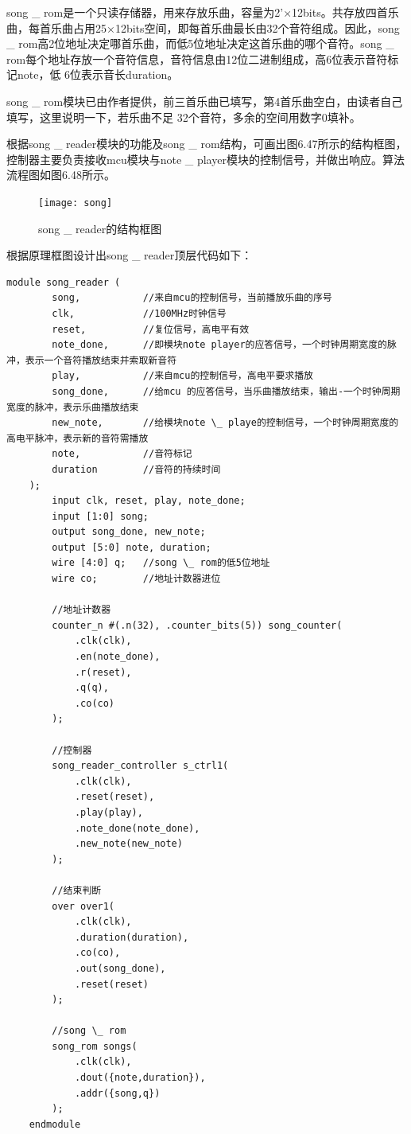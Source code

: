 \documentclass{../source/Experiment}
\begin{document}
                song \_ rom是一个只读存储器，用来存放乐曲，容量为2'×12bits。共存放四首乐曲，每首乐曲占用25×12bits空间，即每首乐曲最长由32个音符组成。因此，song \_ rom高2位地址决定哪首乐曲，而低5位地址决定这首乐曲的哪个音符。song \_ rom每个地址存放一个音符信息，音符信息由12位二进制组成，高6位表示音符标记note，低 6位表示音长duration。 
                
                song \_ rom模块已由作者提供，前三首乐曲已填写，第4首乐曲空白，由读者自己填写，这里说明一下，若乐曲不足 32个音符，多余的空间用数字0填补。
                
                根据song \_ reader模块的功能及song  \_ rom结构，可画出图6.47所示的结构框图，控制器主要负责接收mcu模块与note \_ player模块的控制信号，并做出响应。算法流程图如图6.48所示。

                \begin{figure}[H]
                    \centering
                    \texttt{[image: song]}
                    \caption{song \_ reader的结构框图}
                \end{figure}

                根据原理框图设计出song \_ reader顶层代码如下：
                \begin{lstlisting}[name = song _ reader顶层代码]
    module song_reader (
        song,           //来自mcu的控制信号，当前播放乐曲的序号
        clk,            //100MHz时钟信号
        reset,          //复位信号，高电平有效
        note_done,      //即模块note player的应答信号，一个时钟周期宽度的脉冲，表示一个音符播放结束并索取新音符
        play,           //来自mcu的控制信号，高电平要求播放
        song_done,      //给mcu 的应答信号，当乐曲播放结束，输出-一个时钟周期宽度的脉冲，表示乐曲播放结束
        new_note,       //给模块note \_ playe的控制信号，一个时钟周期宽度的高电平脉冲，表示新的音符需播放
        note,           //音符标记
        duration        //音符的持续时间
    );
        input clk, reset, play, note_done;
        input [1:0] song;
        output song_done, new_note;
        output [5:0] note, duration;
        wire [4:0] q;   //song \_ rom的低5位地址
        wire co;        //地址计数器进位

        //地址计数器
        counter_n #(.n(32), .counter_bits(5)) song_counter(
            .clk(clk),
            .en(note_done),
            .r(reset),
            .q(q),
            .co(co)
        );

        //控制器
        song_reader_controller s_ctrl1(
            .clk(clk), 
            .reset(reset), 
            .play(play), 
            .note_done(note_done), 
            .new_note(new_note)
        );

        //结束判断
        over over1(
            .clk(clk), 
            .duration(duration), 
            .co(co), 
            .out(song_done),
            .reset(reset)
        );

        //song \_ rom
        song_rom songs(
            .clk(clk), 
            .dout({note,duration}), 
            .addr({song,q})
        );
    endmodule
                \end{lstlisting}
\end{document}
